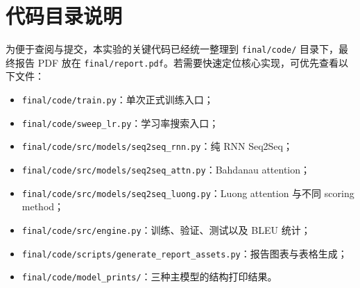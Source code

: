 \documentclass[a4paper]{article}
\begin{document}
\newpage
\appendix
\section{代码目录说明}
为便于查阅与提交，本实验的关键代码已经统一整理到 \texttt{final/code/} 目录下，最终报告 PDF 放在 \texttt{final/report.pdf}。若需要快速定位核心实现，可优先查看以下文件：
\begin{itemize}
    \item \texttt{final/code/train.py}：单次正式训练入口；
    \item \texttt{final/code/sweep\_lr.py}：学习率搜索入口；
    \item \texttt{final/code/src/models/seq2seq\_rnn.py}：纯 RNN Seq2Seq；
    \item \texttt{final/code/src/models/seq2seq\_attn.py}：Bahdanau attention；
    \item \texttt{final/code/src/models/seq2seq\_luong.py}：Luong attention 与不同 scoring method；
    \item \texttt{final/code/src/engine.py}：训练、验证、测试以及 BLEU 统计；
    \item \texttt{final/code/scripts/generate\_report\_assets.py}：报告图表与表格生成；
    \item \texttt{final/code/model\_prints/}：三种主模型的结构打印结果。
\end{itemize}



\end{document}
